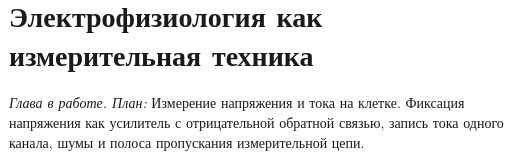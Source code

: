 \chapter{Электрофизиология как измерительная техника}
\label{sec:electrophys}

\emph{Глава в работе. План:} Измерение напряжения и тока на клетке. Фиксация напряжения как усилитель с отрицательной обратной связью, запись тока одного канала, шумы и полоса пропускания измерительной цепи.
